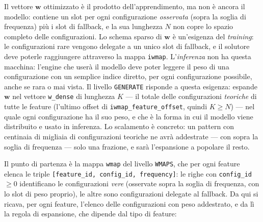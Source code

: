 Il vettore $\bm{w}$ ottimizzato è il prodotto dell'apprendimento, ma non è
ancora il modello: contiene un slot per ogni configurazione
\emph{osservata} (sopra la soglia di frequenza) più i slot di fallback, e la
sua lunghezza $N$ non copre lo spazio completo delle configurazioni. Lo
schema sparso di $\bm{w}$ è un'esigenza del \emph{training}: le
configurazioni rare vengono delegate a un unico slot di fallback, e il
solutore deve poterle raggiungere attraverso la mappa \texttt{iwmap}.
L'\emph{inferenza} non ha questa macchina: l'engine che userà il modello deve
poter leggere il peso di una configurazione con un semplice indice diretto,
per ogni configurazione possibile, anche se rara o mai vista. Il livello
\texttt{GENERATE} risponde a questa esigenza: espande $\bm{w}$ nel vettore
\texttt{w\_dense} di lunghezza $K$ — il totale delle configurazioni
\emph{teoriche} di tutte le feature (l'ultimo offset di
\texttt{iwmap\_feature\_offset}, quindi $K \geq N$) — nel quale ogni
configurazione ha il suo peso, e che è la forma in cui il modello viene
distribuito e usato in inferenza. Lo scalamento è concreto: un pattern con
centinaia di migliaia di configurazioni teoriche ne avrà addestrate — con
sopra la soglia di frequenza — solo una frazione, e sarà l'espansione a
popolare il resto.

Il punto di partenza è la mappa \texttt{wmap} del livello \texttt{WMAPS},
che per ogni feature elenca le triple
\texttt{[feature\_id, config\_id, frequency]}: le righe con
\texttt{config\_id} $\geq 0$ identificano le configurazioni \emph{vere}
(osservate sopra la soglia di frequenza, con lo slot di peso proprio), le
altre sono configurazioni delegate al fallback. Da qui si ricava, per ogni
feature, l'elenco delle configurazioni con peso addestrato, e da lì la regola
di espansione, che dipende dal tipo di feature:

